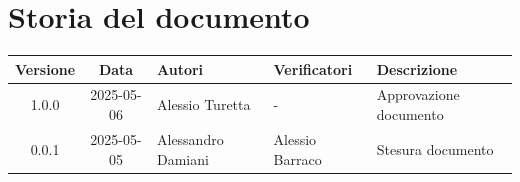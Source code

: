 \section*{Storia del documento}
\begin{tabularx}{\textwidth}{ c c p{3cm} p{3.17cm} X }
    \rowcolor{gray!20}\rule{0pt}{0.5cm}\textbf{Versione} & \textbf{Data} & \textbf{Autori} & \textbf{Verificatori} & \textbf{Descrizione} \\[0.7ex]
    
    \hline
    \rule{0pt}{0.5cm}1.0.0 & 2025-05-06 & Alessio Turetta & - & Approvazione documento\\[0.7ex]
    \hline
    \rule{0pt}{0.5cm}0.0.1 & 2025-05-05 & Alessandro Damiani & Alessio Barraco & Stesura documento\\[0.7ex] 
\end{tabularx}

